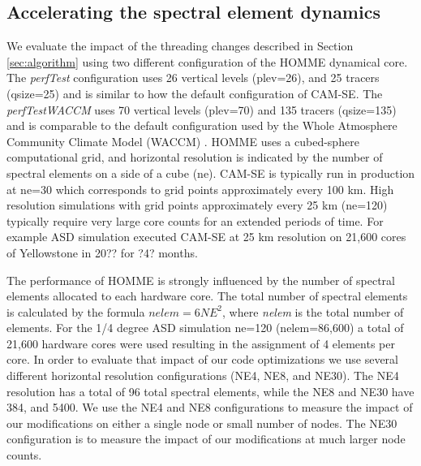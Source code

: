 \subsection{Accelerating the spectral element dynamics}\label{sec:homme-results}

We evaluate the impact of the threading changes described in Section \ref{sec:algorithm} using two different configuration of the HOMME dynamical core.  The {\em perfTest} configuration uses 26 vertical levels (plev=26), and 25 tracers (qsize=25) and is similar to how the default configuration of CAM-SE.  The {\em perfTestWACCM} uses 70 vertical levels (plev=70) and 135 tracers (qsize=135) and is comparable to the default configuration used by the Whole Atmosphere Community Climate Model (WACCM) \cite{waccm}.  HOMME uses a cubed-sphere computational grid, and horizontal resolution is indicated by the number of spectral elements on a side of a cube (ne). CAM-SE is typically run in production at ne=30 which corresponds to grid points approximately every 100 km.  High resolution simulations with grid points approximately every 25 km (ne=120) typically require very large core counts for an extended periods of time.   For example ASD simulation \cite{small2014} executed CAM-SE at 25 km resolution on 21,600 cores of Yellowstone in {\color{red} 20?? for ?4? months}.

The performance of HOMME is strongly influenced by the number of spectral elements allocated to each hardware core.  The total number of spectral elements is calculated by the formula $nelem= 6 NE^2$, where {\em nelem} is the total number of elements.   For the 1/4 degree ASD simulation \cite{small2014} ne=120 (nelem=86,600) a total of 21,600 hardware cores were used resulting in the assignment of 4 elements per core. In order to evaluate that impact of our code optimizations we use several different horizontal resolution configurations (NE4, NE8, and NE30). The NE4 resolution has a total of 96 total spectral elements, while the NE8 and NE30 have 384, and 5400.  We use the NE4 and NE8 configurations to measure the impact of our modifications on either a single node or small number of nodes.  The NE30 configuration is to measure the impact of our modifications at much larger node counts.  



